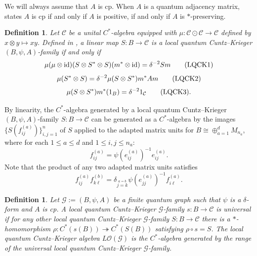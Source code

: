 \documentclass[11pt]{article}
\theoremstyle{plain}
\theoremstyle{nonumberplain}
\theoremstyle{plain}
\newtheorem{definition}[lemma]{Definition}
\theoremstyle{nonumberplain}
\DeclareMathOperator{\id}{id}
\newcommand\1{{\bf 1}}
\newcommand\cC{{\mathcal C}}
\newcommand\cG{{\mathcal G}}
\newcommand\cO{{\mathcal O}}
\newcommand{\<}{\left\langle}
\renewcommand{\>}{\right\rangle}
\begin{document}
We will always assume that $A$ is cp. When $A$ is a quantum adjacency matrix, \cite[Proposition 2.23]{Matsuda} states $A$ is cp if and only if $A$ is positive, if and only if $A$ is $*$-preserving.


\begin{definition}\label{def:lqck_family}
Let $\cC$ be a unital $C^*$-algebra equipped with $\mu:\cC\odot \cC\to \cC$ defined by $x\otimes y\mapsto xy$. Defined in \cite{BHINW23}, a linear map $S:B\to \cC$ is a {\em local quantum Cuntz--Krieger $(B,\psi,A)$-family} if and only if
\begin{equation}\label{eq:lqck1}
    \mu  (\mu\otimes \id)  (S\otimes S^*\otimes S)  (m^*\otimes \id)
     =\delta^{-2} S  m \tag{\text{LQCK1}}
\end{equation}
\vspace{-.5cm}
\begin{equation}\label{eq:lqck2}
\mu  (S^*\otimes S) = \delta^{-2}  \mu  (S\otimes S^*)  m^*  A  m\tag{\text{LQCK2}}
\end{equation}
\vspace{-.5cm}
\begin{equation}\label{eq:lqck3}
     \mu  (S\otimes S^*)  m^*(1_B)=\delta^{-2} 1_{\mathcal{C}} \tag{\text{\text{LQCK3}}}.
\end{equation}
\end{definition}


By linearity, the $C^*$-algebra generated by a local quantum Cuntz--Krieger $(B,\psi,A)$-family $S:B\to \mathcal{C}$ can be generated as a $C^*$-algebra by the images $\{S(f^{(a)}_{ij})\}_{i,j=1}^n$ of $S$ applied to the adapted matrix units for $B\cong \oplus_{a=1}^d M_{n_a}$, where for each $1\leq a \leq d$ and $1\leq i,j\leq n_a:$ \[f_{ij}^{(a)}=\psi(e_{ij}^{(a)})^{-1} e_{ij}^{(a)}.\]
Note that the product of any two adapted matrix units satisfies
\[
f_{ij}^{(a)}f_{k\ell}^{(b)} = \delta_{\stackrel{a=b}{j=k}} \psi(e_{jj}^{(a)})^{-1} f_{i\ell}^{(a)}.
\]

 \begin{definition}
   Let $\cG:=(B,\psi,A)$ be a finite quantum graph such that $\psi$ is a $\delta$-form and $A$ is cp. A local quantum Cuntz--Krieger $\cG$-family $s:B\to \mathcal{C}$ is {\em universal} if for any other local quantum Cuntz--Krieger $\cG$-family $S:B\to \mathcal{C}$ there is a $*$-homomorphism $\rho: C^*(s(B))\twoheadrightarrow C^*(S(B))$ satisfying $\rho \circ s=S$. The {\em local quantum Cuntz--Krieger algebra} $L\cO(\cG)$ is the $C^*$-algebra generated by the range of the universal local quantum Cuntz--Krieger $\cG$-family. 
 \end{definition}
\end{document}
